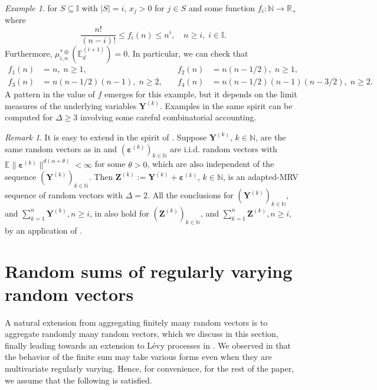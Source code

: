 \documentclass[aos]{imsart}
\numberwithin{equation}{section}
\theoremstyle{plain} %
\theoremstyle{remark}
\newtheorem{example}[theorem]{Example}
\newtheorem{remark}[theorem]{Remark}
\newcommand{\E}{\mathbb{E}}
\newcommand{\N}{\mathbb{N}}
\newcommand{\R}{\mathbb{R}}
\def\bepsilon{\boldsymbol \varepsilon}
\def\bY{\boldsymbol Y}
\def\bZ{\boldsymbol Z}
\begin{document}
\begin{example}
    for $S\subseteq \mathbb{I}$ with $|S|=i$, $x_j>0$ for $j\in S$ and some function $f_i:\mathbb{N}\to \R_+$ where $$ \frac{n!}{(n-i)!} \le f_i(n) \le n^i, \quad n\ge i, \; i\in \mathbb{I}.$$
Furthermore, $\mu_{i,n}^{*\oplus}(\E_d^{(i+1)})=0$. In particular, we can check that
 \begin{align*}
    f_1(n) &= n, \; n\ge 1, \quad& f_2(n)&=  n(n- 1/2),\; {n\ge 1},\\
    f_3(n) &= n(n-1/2)(n-1), \; {n\ge 2},\quad & f_4(n)&=  n(n-1/2)(n-1)(n-3/2),\; {n\ge 2}.
\end{align*}
A pattern in the  value of $f$ emerges for this example, but it depends on the limit measures of the underlying variables $\bY^{(k)}$. Examples in the same spirit can be computed for $\Delta\ge 3$ involving some careful  combinatorial accounting.
\end{example}

\begin{remark}
It is easy to extend  in the spirit of . Suppose $\bY^{(k)},\,  k\in\N$, are the same random vectors as in  and $(\bepsilon^{(k)})_{k\in\N}$ are i.i.d. random vectors with $\E\|\bepsilon^{(k)}\|^{d(\alpha+\theta)}<\infty$ for some $\theta>0$, which are also independent of the sequence $(\bY^{(k)})_{k\in\N}$. Then $\bZ^{(k)}:=\bY^{(k)}+\bepsilon^{(k)}$, $k\in\N$, is an adapted-MRV sequence of random vectors with $\Delta=2$.  All the conclusions for $(\bY^{(k)})_{k\in\N}$, and $\sum_{k=1}^n\bY^{(k)}, n\ge i$, in  also hold for
$(\bZ^{(k)})_{k\in\N}$, and $\sum_{k=1}^n\bZ^{(k)}, n\ge i$, by an
application of .
\end{remark}



\section{Random sums of regularly varying random vectors}\label{sec:randomsum}
A natural extension from aggregating finitely many random vectors is to aggregate randomly many random vectors, which we discuss in this section, finally leading towards an extension to L\'evy processes in . We observed in  that the behavior of the finite sum may take various forms even when they are multivariate regularly varying. Hence, for convenience, for the rest of the paper, we assume that the following is satisfied.
\end{document}
